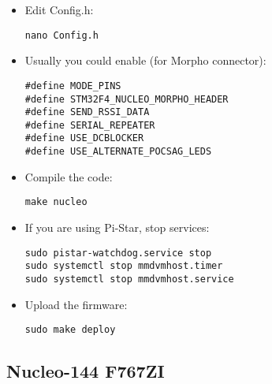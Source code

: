 \documentclass[]{article}
\begin{document}
\begin{itemize}[leftmargin=*]
\item Edit Config.h:

\begin{lstlisting}[style=DOS]
nano Config.h
\end{lstlisting}

\item Usually you could enable (for Morpho connector):

\begin{verbatim}
#define MODE_PINS
#define STM32F4_NUCLEO_MORPHO_HEADER
#define SEND_RSSI_DATA
#define SERIAL_REPEATER
#define USE_DCBLOCKER
#define USE_ALTERNATE_POCSAG_LEDS
\end{verbatim}

\item Compile the code:

\begin{lstlisting}[style=DOS]
make nucleo
\end{lstlisting}

\item If you are using Pi-Star, stop services:

\begin{lstlisting}[style=DOS]
sudo pistar-watchdog.service stop
sudo systemctl stop mmdvmhost.timer
sudo systemctl stop mmdvmhost.service
\end{lstlisting}

\item Upload the firmware:

\begin{lstlisting}[style=DOS]
sudo make deploy
\end{lstlisting}

\end{itemize}

\subsection{Nucleo-144 F767ZI}
\end{document}
